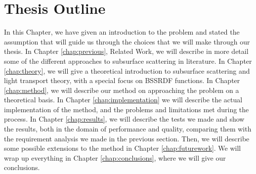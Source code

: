 \section{Thesis Outline}
In this Chapter, we have given an introduction to the problem and stated the assumption that will guide us through the choices that we will make through our thesis. In Chapter \ref{chap:previous}, Related Work, we will describe in more detail some of the different approaches to subsurface scattering in literature. In Chapter \ref{chap:theory}, we will give a theoretical introduction to subsurface scattering and light transport theory, with a special focus on BSSRDF functions. In Chapter \ref{chap:method}, we will describe our method on approaching the problem on a theoretical basis. In Chapter \ref{chap:implementation} we will describe the actual implementation of the method, and the problems and limitations met during the process. In Chapter \ref{chap:results}, we will describe the tests we made and show the results, both in the domain of performance and quality, comparing them with the requirement analysis we made in the previous section. Then, we will describe some possible extensions to the method in Chapter \ref{chap:futurework}. We will wrap up everything in Chapter \ref{chap:conclusions}, where we will give our conclusions. 